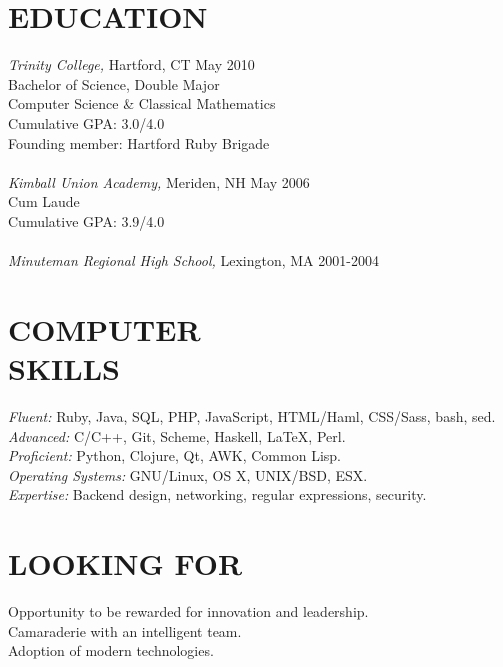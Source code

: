\documentclass[line,margin]{res}
\begin{document}
\begin{resume}
\section{EDUCATION}
	{\sl Trinity College,}
	Hartford, CT \hfill May 2010 \\
	Bachelor of Science, Double Major \\
	Computer Science \& Classical Mathematics \\
	Cumulative GPA: 3.0/4.0 \\
	Founding member: Hartford Ruby Brigade \\
	\\
	{\sl Kimball Union Academy,}
	Meriden, NH \hfill May 2006 \\
	Cum Laude \\
	Cumulative GPA: 3.9/4.0 \\
	\\
	{\sl Minuteman Regional High School,}
	Lexington, MA \hfill 2001-2004
                
\section{COMPUTER \\ SKILLS}
	{\sl Fluent:} 
	Ruby, 
	Java, 
	SQL, 
	PHP, 
	JavaScript, 
	HTML/Haml,
	CSS/Sass, 
	bash,
	sed.
	\\
	{\sl Advanced:}
	C/C++, 
	Git,
	Scheme,
	Haskell,
	\LaTeX,
	Perl.
	\\
	{\sl Proficient:} 
	Python,
	Clojure,
	Qt,
	AWK,
	Common Lisp.
	\\
	{\sl Operating Systems:}
	GNU/Linux, OS X, UNIX/BSD, ESX.
	\\
	{\sl Expertise:}
	Backend design,
	networking,
	regular expressions,
	security.

\section{LOOKING FOR}
	Opportunity to be rewarded for innovation and leadership. \\
	Camaraderie with an intelligent team. \\
	Adoption of modern technologies.
	
	
\end{resume}
\end{document}
